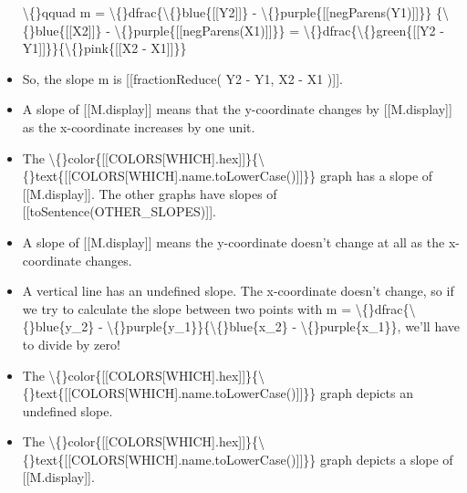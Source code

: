 \documentclass{article}
\begin{document}
\begin{itemize}
                        
                            \textbackslash\{\}qquad m = \textbackslash\{\}dfrac\{\textbackslash\{\}blue\{[[Y2]]\} - \textbackslash\{\}purple\{[[negParens(Y1)]]\}\}
                            \{\textbackslash\{\}blue\{[[X2]]\} - \textbackslash\{\}purple\{[[negParens(X1)]]\}\} =
                            \textbackslash\{\}dfrac\{\textbackslash\{\}green\{[[Y2 - Y1]]\}\}\{\textbackslash\{\}pink\{[[X2 - X1]]\}\}
  \item So, the slope m is [[fractionReduce( Y2 - Y1, X2 - X1 )]].
  \item A slope of [[M.display]] means that the y-coordinate changes by [[M.display]]
                    as the x-coordinate increases by one unit.
  \item The \textbackslash\{\}color\{[[COLORS[WHICH].hex]]\}\{\textbackslash\{\}text\{[[COLORS[WHICH].name.toLowerCase()]]\}\}
                        graph has a slope of [[M.display]].
                        The other graphs have slopes of [[toSentence(OTHER\_SLOPES)]].
  \item A slope of [[M.display]] means the
                    y-coordinate doesn't change at all as the x-coordinate changes.
  \item A vertical line has an undefined slope.
                    The x-coordinate doesn't change,
                    so if we try to calculate the slope between two points with
                    m = \textbackslash\{\}dfrac\{\textbackslash\{\}blue\{y\_2\} - \textbackslash\{\}purple\{y\_1\}\}\{\textbackslash\{\}blue\{x\_2\} - \textbackslash\{\}purple\{x\_1\}\},
                    we'll have to divide by zero!
  \item The \textbackslash\{\}color\{[[COLORS[WHICH].hex]]\}\{\textbackslash\{\}text\{[[COLORS[WHICH].name.toLowerCase()]]\}\}
                    graph depicts an undefined slope.
  \item The \textbackslash\{\}color\{[[COLORS[WHICH].hex]]\}\{\textbackslash\{\}text\{[[COLORS[WHICH].name.toLowerCase()]]\}\}
                    graph depicts a slope of [[M.display]].
\end{itemize}
\end{document}
